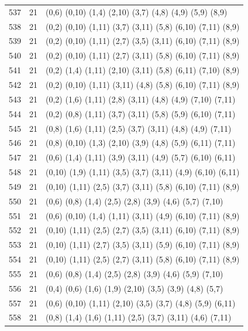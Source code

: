 \begin{appendix}
{\begin{longtable}{lll}
537& 21 & (0,6)   (0,10) (1,4)  (2,10)  (3,7)   (4,8)   (4,9)   (5,9)   (8,9)\\
538& 21 & (0,2)   (0,10) (1,11) (3,7)   (3,11)  (5,8)   (6,10)  (7,11)  (8,9)\\
539& 21 & (0,2)   (0,10) (1,11) (2,7)   (3,5)   (3,11)  (6,10)  (7,11)  (8,9)\\
540& 21 & (0,2)   (0,10) (1,11) (2,7)   (3,11)  (5,8)   (6,10)  (7,11)  (8,9)\\
541& 21 & (0,2)   (1,4)  (1,11) (2,10)  (3,11)  (5,8)   (6,11)  (7,10)  (8,9)\\
542& 21 & (0,2)   (0,10) (1,11) (3,11)  (4,8)   (5,8)   (6,10)  (7,11)  (8,9)\\
543& 21 & (0,2)   (1,6)  (1,11) (2,8)   (3,11)  (4,8)   (4,9)   (7,10)  (7,11)\\
544& 21 & (0,2)   (0,8)  (1,11) (3,7)   (3,11)  (5,8)   (5,9)   (6,10)  (7,11)\\
545& 21 & (0,8)   (1,6)  (1,11) (2,5)   (3,7)   (3,11)  (4,8)   (4,9)   (7,11)\\
546& 21 & (0,8)   (0,10) (1,3)  (2,10)  (3,9)   (4,8)   (5,9)   (6,11)  (7,11)\\
547& 21 & (0,6)   (1,4)  (1,11) (3,9)   (3,11)  (4,9)   (5,7)   (6,10)  (6,11)\\
548& 21 & (0,10)  (1,9)  (1,11) (3,5)   (3,7)   (3,11)  (4,9)   (6,10)  (6,11)\\
549& 21 & (0,10)  (1,11) (2,5)  (3,7)   (3,11)  (5,8)   (6,10)  (7,11)  (8,9)\\
550& 21 & (0,6)   (0,8)  (1,4)  (2,5)   (2,8)   (3,9)   (4,6)   (5,7)   (7,10)\\
551& 21 & (0,6)   (0,10) (1,4)  (1,11)  (3,11)  (4,9)   (6,10)  (7,11)  (8,9)\\
552& 21 & (0,10)  (1,11) (2,5)  (2,7)   (3,5)   (3,11)  (6,10)  (7,11)  (8,9)\\
553& 21 & (0,10)  (1,11) (2,7)  (3,5)   (3,11)  (5,9)   (6,10)  (7,11)  (8,9)\\
554& 21 & (0,10)  (1,11) (2,5)  (2,7)   (3,11)  (5,8)   (6,10)  (7,11)  (8,9)\\
555& 21 & (0,6)   (0,8)  (1,4)  (2,5)   (2,8)   (3,9)   (4,6)   (5,9)   (7,10)\\
556& 21 & (0,4)   (0,6)  (1,6)  (1,9)   (2,10)  (3,5)   (3,9)   (4,8)   (5,7)\\
557& 21 & (0,6)   (0,10) (1,11) (2,10)  (3,5)   (3,7)   (4,8)   (5,9)   (6,11)\\
558& 21 & (0,8)   (1,4)  (1,6)  (1,11)  (2,5)   (3,7)   (3,11)  (4,6)   (7,11)\\

\end{longtable}}
\end{appendix}
